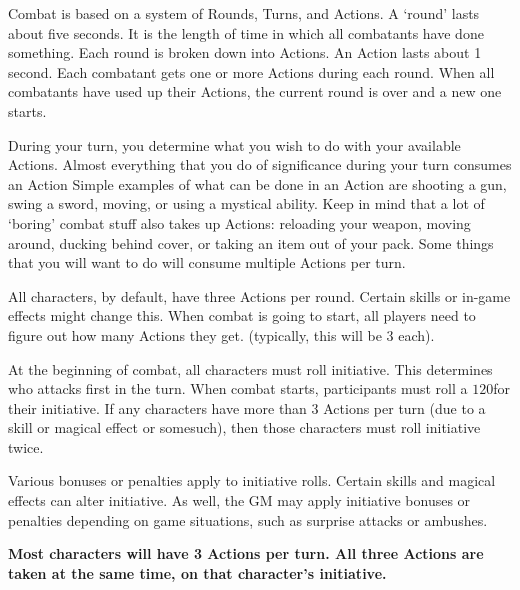 \documentclass[twoside]{book}
\begin{document}
    {  
     Combat is based on a system of Rounds, Turns, and
             Actions. A `round' lasts about five seconds. It
             is the length of time in which all combatants have done
             something. Each round is broken down into Actions. An Action
             lasts about 1 second. Each combatant gets one or more
             Actions during each round. When all combatants have used up
             their Actions, the current round is over and a new one
             starts. 
    }
  
    {  
     During your turn, you determine what you wish to do
             with your available Actions. Almost everything that you do
             of significance during your turn consumes an Action Simple
             examples of what can be done in an Action are shooting a
             gun, swing a sword, moving, or using a mystical ability.
             Keep in mind that a lot of `boring' combat stuff
             also takes up Actions: reloading your weapon, moving around,
             ducking behind cover, or taking an item out of your pack.
             Some things that you will want to do will consume multiple
             Actions per turn. 
    }
  
    {  
     All characters, by default, have three Actions per
             round. Certain skills or in-game effects might change this.
             When combat is going to start, all players need to figure
             out how many Actions they get. (typically, this will be 3
             each). 
    }
  
    {  
     At the beginning of combat, all characters must roll
             initiative. This determines who attacks first in the turn.
             When combat starts, participants must roll a \ensuremath{1}\ensuremath{20}\ensuremath{}for their
             initiative. If any characters have more than 3 Actions per
             turn (due to a skill or magical effect or somesuch), then
             those characters must roll initiative twice. 
    }
  
    {  
     Various bonuses or penalties apply to initiative
             rolls. Certain skills and magical effects can alter
             initiative. As well, the GM may apply initiative bonuses or
             penalties depending on game situations, such as surprise
             attacks or ambushes. 
    }
  

 \textbf{ Most characters will have 3 Actions per turn. All
             three Actions are taken at the same time, on that
             character's initiative. }
\end{document}
